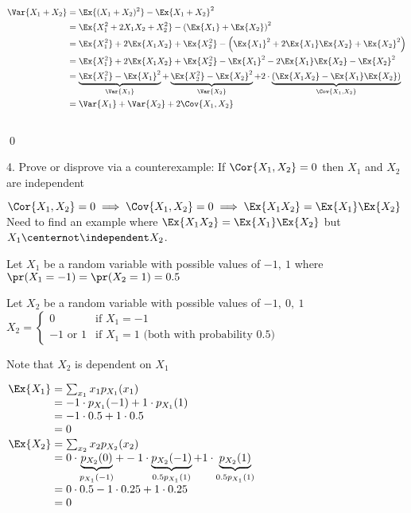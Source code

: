 \documentclass[12pt, letterpaper]{article}
\begin{document}
\begin{align*}
\Var{X_1 + X_2} &= \Ex{ (X_1 + X_2)^2} - \Ex{X_1 + X_2}^2 
\\
& = \Ex{ X_1^2 + 2 X_1 X_2 + X_2^2} - \left( \Ex{X_1} + \Ex{X_2} \right)^2 
\\
&= \Ex{X_1^2} + 2 \Ex{X_1 X_2} + \Ex{X_2^2} - \left( \Ex{X_1}^2 + 2 \Ex{X_1} \Ex{X_2} + \Ex{X_2}^2 \right)
\\
& = \Ex{X_1^2} + 2 \Ex{X_1 X_2} + \Ex{X_2^2} -  \Ex{X_1}^2 - 2 \Ex{X_1} \Ex{X_2} - \Ex{X_2}^2 
\\
& =
\underbrace{ \Ex{X_1^2} - \Ex{X_1}^2 }_{\Var{X_1}} 
+ 
\underbrace{ \Ex{X_2^2} - \Ex{X_2}^2}_{\Var{X_2}} 
+ 2 \cdot 
\underbrace{ \left( \Ex{ X_1 X_2} - \Ex{X_1} \Ex{X_2} \right) }_{ \Cov{X_1, X_2}}
\\
& = \Var{X_1} + \Var{X_2} + 2 \Cov{X_1, X_2}
\end{align*} \vspace{-48pt} \\ \qed 
\vspace{12pt} 

4. Prove or disprove via a counterexample: If $\Cor{X_1, X_2} = 0$ then $X_1$ and $X_2$ are independent 


$\Cor{X_1, X_2} = 0 \implies \Cov{X_1, X_2} = 0 \implies \Ex{ X_1 X_2} = \Ex{X_1}\Ex{X_2}$ \\
Need to find an example where $\Ex{ X_1 X_2} = \Ex{X_1}\Ex{X_2}$ but $X_1 \centernot\independent X_2$.   

Let $X_1$ be a random variable with possible values of $-1, \ 1$ where \\
$\pr(X_1 = -1) = \pr(X_2 = 1) = 0.5$ 

Let $X_2$ be a random variable with possible values of $-1, \ 0, \ 1$ \\
$X_2 = \begin{cases}
0 & \text{if } X_1=-1 \\
-1 \text{ or } 1 & \text{if } X_1 = 1 \text{ (both with probability 0.5)} 
\end{cases}$ 

Note that $X_2$ is dependent on $X_1$ 

$
\arraycolsep=1.4pt
\begin{array}{r c l } 
\Ex{X_1} &=& \sum_{x_1} x_1 p_{X_1}(x_1) 
\\
&=& -1 \cdot p_{X_1}(- 1) + 1 \cdot p_{X_1}(1)
\\
&=& -1 \cdot 0.5 + 1 \cdot 0.5 
\\
&=&
0 
\end{array}$ 
\hfill 
$
\arraycolsep=1.4pt
\begin{array}{r c l } 
\Ex{X_2} &=& \sum_{x_2} x_2 p_{X_2}(x_2) 
\\
&=& 0 \cdot 
\underbrace{p_{X_2}(0)}_{p_{X_1}(-1)}
 + -1 \cdot 
\underbrace{p_{X_2}(-1)}_{0.5 p_{X_1}(1)} + 1 \cdot 
\underbrace{ p_{X_2}( 1)} _{0.5  p_{X_1}(1)} 
\\
&=& 0 \cdot 0.5  -1 \cdot 0.25 + 1 \cdot 0.25 
\\
&=&
0 
\end{array}$ 
\end{document}
